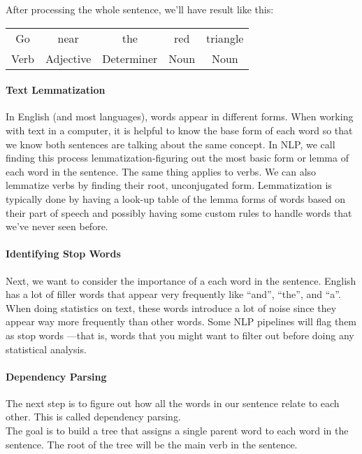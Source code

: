 After processing the whole sentence, we'll have result like this:
\begin{table}[h]
    \centering
    \begin{tabular}{ccccc}
        Go   & near      & the        & red  & triangle \\
        Verb & Adjective & Determiner & Noun & Noun    
    \end{tabular}
\end{table}

\paragraph{Text Lemmatization}
In English (and most languages), words appear in different forms. When working with text in a computer, it is helpful to know the base form of each word so that we know both sentences are talking about the same concept. In NLP, we call finding this process lemmatization-figuring out the most basic form or lemma of each word in the sentence. The same thing applies to verbs. We can also lemmatize verbs by finding their root, unconjugated form. Lemmatization is typically done by having a look-up table of the lemma forms of words based on their part of speech and possibly having some custom rules to handle words that we’ve never seen before.
\paragraph{Identifying Stop Words}
Next, we want to consider the importance of a each word in the sentence. English has a lot of filler words that appear very frequently like “and”, “the”, and “a”. When doing statistics on text, these words introduce a lot of noise since they appear way more frequently than other words. Some NLP pipelines will flag them as stop words —that is, words that you might want to filter out before doing any statistical analysis.

\paragraph{Dependency Parsing}
The next step is to figure out how all the words in our sentence relate to each other. This is called dependency parsing.\\

The goal is to build a tree that assigns a single parent word to each word in the sentence. The root of the tree will be the main verb in the sentence.\\

